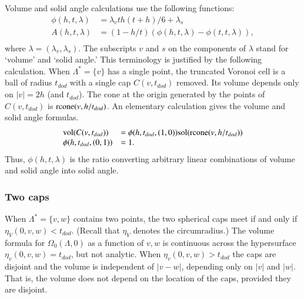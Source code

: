 \documentclass{article} %
\begin{document}
Volume and solid angle calculations use the following functions:
\begin{equation}
\begin{array}{lll}
\phi(h,t,\lambda) &= \lambda_v t h (t+h)/6 + \lambda_s\\
A(h,t,\lambda) &= (1-h/t)(\phi(h,t,\lambda)-\phi(t,t,\lambda)),\\
\end{array}
\end{equation}
where $\lambda=(\lambda_v,\lambda_s)$.  The subscripts $v$ and $s$
on the components of $\lambda$ stand for `volume' and `solid angle.'
This terminology is justified by the following calculation.
%
%
%
When $\Lambda^* = \{v\}$ has a single point, the truncated Voronoi
cell is a ball of radius $t_{dod}$
with a single cap $C(v,t_{dod})$ removed.  Its volume depends
only on $|v|=2h$ (and $t_{dod}$).  
The cone at the origin generated by the points of $C(v,t_{dod})$ is
${\operatorname{rcone}}(v,h/t_{dod})$.  An elementary calculation gives the volume and
solid angle formulas.
\begin{equation}  
  \begin{array}{lll}
    {\operatorname{vol}}(C(v,t_{dod})) &= \phi(h,t_{dod},(1,0)){\operatorname{sol}}({\operatorname{rcone}}(v,h/t_{dod})) \\
     \phi(h,t_{dod},(0,1))&=1.\\
  \end{array}
\end{equation}
Thus, $\phi(h,t,\lambda)$ is the ratio converting  arbitrary linear combinations of volume and solid angle into solid angle.

\subsubsection{Two caps}

When $\Lambda^*=\{v,w\}$ contains two points, the two spherical
caps meet if and only if $\eta_V(0,v,w) < t_{dod}$.  (Recall that
$\eta_V$ denotes the circumradius.)   The volume formula for
$\Omega_0(\Lambda,0)$ as a function of $v,w$ is continuous
across the hypersurface $\eta_v(0,v,w)=t_{dod}$, but not analytic.
When $\eta_v(0,v,w) > t_{dod}$ the caps are disjoint and the
volume is independent of $|v-w|$, depending only on $|v|$ and $|w|$.
That is, the volume does not depend on the location of the caps,
provided they are disjoint.
\end{document}
